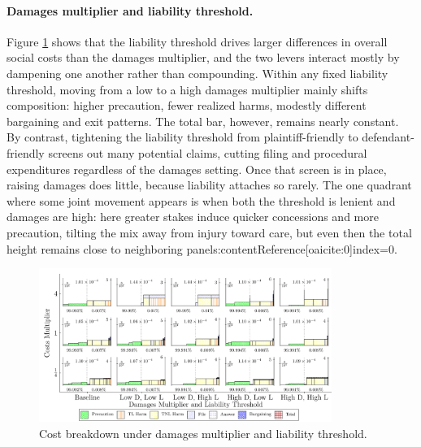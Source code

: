 \documentclass{article}
\begin{document}
\paragraph{Damages multiplier and liability threshold.}
Figure \ref{fig:dm_liability} shows that the liability threshold drives larger differences in overall social costs than the damages multiplier, and the two levers interact mostly by dampening one another rather than compounding. Within any fixed liability threshold, moving from a low to a high damages multiplier mainly shifts composition: higher precaution, fewer realized harms, modestly different bargaining and exit patterns. The total bar, however, remains nearly constant. By contrast, tightening the liability threshold from plaintiff-friendly to defendant-friendly screens out many potential claims, cutting filing and procedural expenditures regardless of the damages setting. Once that screen is in place, raising damages does little, because liability attaches so rarely. The one quadrant where some joint movement appears is when both the threshold is lenient and damages are high: here greater stakes induce quicker concessions and more precaution, tilting the mix away from injury toward care, but even then the total height remains close to neighboring panels:contentReference[oaicite:0]{index=0}.

\begin{figure}[ht]
  \centering
  \includegraphics[width=0.85\textwidth]{../Figures/Cost Breakdown Damages Multiplier and Liability Threshold (All Rows).pdf}
  \caption{Cost breakdown under damages multiplier and liability threshold.}
  \label{fig:dm_liability}
\end{figure}
\end{document}
